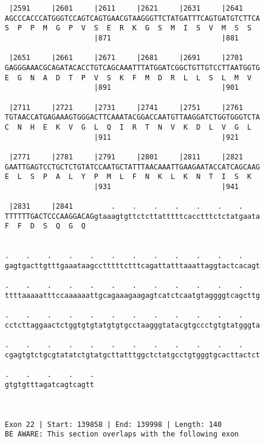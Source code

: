 \documentclass{article}
\begin{document}
\begin{Verbatim}
 |2591     |2601     |2611     |2621     |2631     |2641    
AGCCCACCCATGGGTCCAGTCAGTGAACGTAAGGGTTCTATGATTTCAGTGATGTCTTCA
S  P  P  M  G  P  V  S  E  R  K  G  S  M  I  S  V  M  S  S  
                     |871                          |881     
  
 |2651     |2661     |2671     |2681     |2691     |2701    
GAGGGAAACGCAGATACACCTGTCAGCAAATTTATGGATCGGCTGTTGTCCTTAATGGTG
E  G  N  A  D  T  P  V  S  K  F  M  D  R  L  L  S  L  M  V  
                     |891                          |901     
  
 |2711     |2721     |2731     |2741     |2751     |2761    
TGTAACCATGAGAAAGTGGGACTTCAAATACGGACCAATGTTAAGGATCTGGTGGGTCTA
C  N  H  E  K  V  G  L  Q  I  R  T  N  V  K  D  L  V  G  L  
                     |911                          |921     
  
 |2771     |2781     |2791     |2801     |2811     |2821    
GAATTGAGTCCTGCTCTGTATCCAATGCTATTTAACAAATTGAAGAATACCATCAGCAAG
E  L  S  P  A  L  Y  P  M  L  F  N  K  L  K  N  T  I  S  K  
                     |931                          |941     
  
 |2831     |2841         .    .    .    .    .    .    .    
TTTTTTGACTCCCAAGGACAGgtaaagtgttctcttatttttcacctttctctatgaata
F  F  D  S  Q  G  Q                                         
                                                            
  
.    .    .    .    .    .    .    .    .    .    .    .    
gagtgacttgtttgaaataagcctttttctttcagattatttaaattaggtactcacagt
                                                            
.    .    .    .    .    .    .    .    .    .    .    .    
ttttaaaaatttccaaaaaattgcagaaagaagagtcatctcaatgtaggggtcagcttg
                                                            
.    .    .    .    .    .    .    .    .    .    .    .    
cctcttaggaactctggtgtgtatgtgtgcctaagggtatacgtgccctgtgtatgggta
                                                            
.    .    .    .    .    .    .    .    .    .    .    .    
cgagtgtctgcgtatatctgtatgcttatttggctctatgcctgtgggtgcacttactct
                                                            
.    .    .    .    .
gtgtgtttagatcagtcagtt
                     
                     
 
Exon 22 | Start: 139858 | End: 139998 | Length: 140
BE AWARE: This section overlaps with the following exon




\end{Verbatim}
\end{document}

